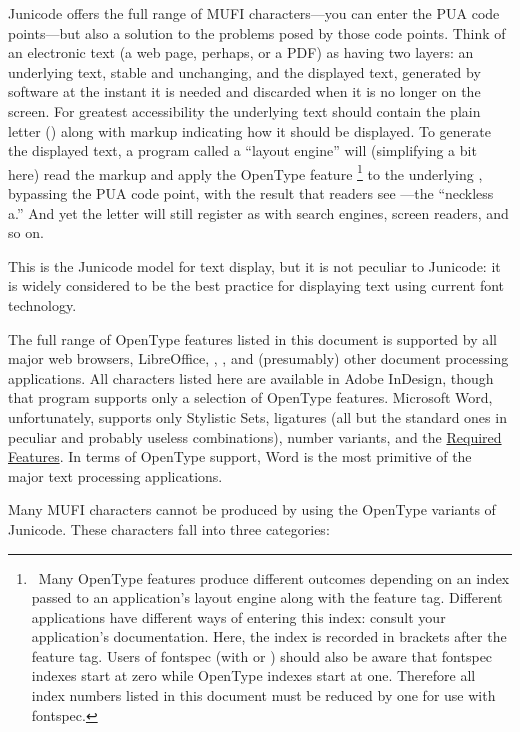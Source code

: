 Junicode offers the full range of MUFI characters---you can enter the PUA code points---but also a solution to the
problems posed by those code points. Think of an electronic text (a web page, perhaps, or a PDF) as having two layers:
an underlying text, stable and unchanging, and the displayed text, generated by software at the instant it is needed
and discarded when it is no longer on the screen. For greatest accessibility the underlying text should contain the
plain letter  () along with markup indicating how it should be displayed. To generate
the displayed text, a program called a ``layout engine'' will (simplifying a bit here) read the markup and apply the
OpenType feature \footnote{\ Many OpenType features produce different outcomes depending on
an index passed to an application’s layout engine along with the feature tag. Different applications have different
ways of entering this index: consult your application’s documentation. Here, the index is recorded in brackets after
the feature tag. Users of fontspec (with {\XeLaTeX} or {\LuaTeX}) should also be aware that fontspec indexes start at zero
while OpenType indexes start at one. Therefore all index numbers listed in this document must be reduced by one for
use with fontspec.\par } to the underlying , bypassing the PUA code point, with the result that
readers see ---the ``neckless a.'' And yet the letter will still register as
 with search engines, screen readers, and so on.

This is the Junicode model for text display, but it is not peculiar to Junicode: it is widely considered to be the best
practice for displaying text using current font technology.

The full range of OpenType features listed in this document is supported by all major web browsers, LibreOffice, {\XeTeX},
{\LuaTeX}, and (presumably) other document processing applications. All characters listed here are available in Adobe
InDesign, though that program supports only a selection of OpenType features. Microsoft Word, unfortunately, supports
only Stylistic Sets, ligatures (all but the standard ones in peculiar and probably useless combinations), number
variants, and the \hyperlink{req}{Required Features}. In terms of
OpenType support, Word is the most primitive of the major text processing applications.

Many MUFI characters cannot be produced by using the OpenType variants of Junicode. These characters fall into three
categories:

